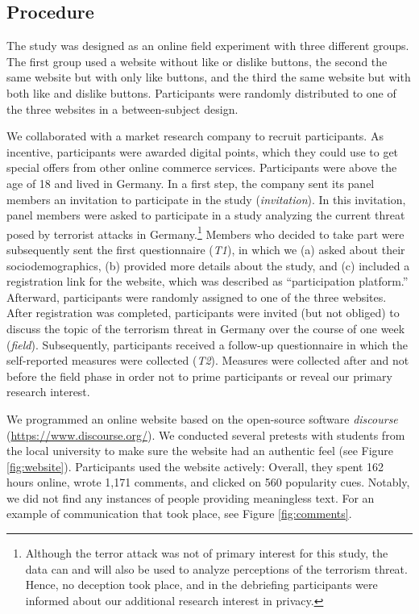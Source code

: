 \documentclass[
  english,
  man,floatsintext]{apa6}
\begin{document}
\hypertarget{procedure}{%
\subsection{Procedure}\label{procedure}}

The study was designed as an online field experiment with three different groups.
The first group used a website without like or dislike buttons, the second the same website but with only like buttons, and the third the same website but with both like and dislike buttons.
Participants were randomly distributed to one of the three websites in a between-subject design.

We collaborated with a market research company to recruit participants.
As incentive, participants were awarded digital points, which they could use to get special offers from other online commerce services.
Participants were above the age of 18 and lived in Germany.
In a first step, the company sent its panel members an invitation to participate in the study (\emph{invitation}).
In this invitation, panel members were asked to participate in a study analyzing the current threat posed by terrorist attacks in Germany.\footnote{Although the terror attack was not of primary interest for this study, the data can and will also be used to analyze perceptions of the terrorism threat. Hence, no deception took place, and in the debriefing participants were informed about our additional research interest in privacy.}
Members who decided to take part were subsequently sent the first questionnaire (\emph{T1}), in which we (a) asked about their sociodemographics, (b) provided more details about the study, and (c) included a registration link for the website, which was described as ``participation platform.''
Afterward, participants were randomly assigned to one of the three websites.
After registration was completed, participants were invited (but not obliged) to discuss the topic of the terrorism threat in Germany over the course of one week (\emph{field}).
Subsequently, participants received a follow-up questionnaire in which the self-reported measures were collected (\emph{T2}).
Measures were collected after and not before the field phase in order not to prime participants or reveal our primary research interest.

We programmed an online website based on the open-source software \emph{discourse} (\url{https://www.discourse.org/}).
We conducted several pretests with students from the local university to make sure the website had an authentic feel (see Figure \ref{fig:website}).
Participants used the website actively: Overall, they spent 162 hours online, wrote 1,171 comments, and clicked on 560 popularity cues.
Notably, we did not find any instances of people providing meaningless text.
For an example of communication that took place, see Figure \ref{fig:comments}.
\end{document}
